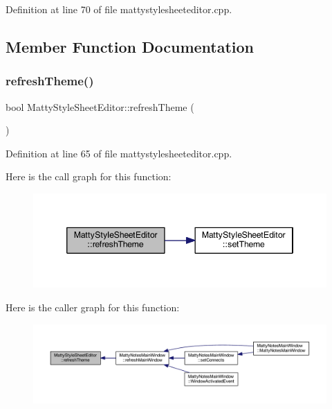 Definition at line 70 of file mattystylesheeteditor.\+cpp.



\subsection{Member Function Documentation}
\hypertarget{classMattyStyleSheetEditor_a203c6d82e1fa8bbbf61d30de4191fc01}{}\label{classMattyStyleSheetEditor_a203c6d82e1fa8bbbf61d30de4191fc01} 
\subsubsection{\texorpdfstring{refresh\+Theme()}{refreshTheme()}}
{\footnotesize\ttfamily bool Matty\+Style\+Sheet\+Editor\+::refresh\+Theme (\begin{DoxyParamCaption}{ }\end{DoxyParamCaption})\hspace{0.3cm}{\ttfamily [static]}}



Definition at line 65 of file mattystylesheeteditor.\+cpp.

Here is the call graph for this function\+:
\nopagebreak
\begin{figure}[H]
\begin{center}
\leavevmode
\includegraphics[width=346pt]{classMattyStyleSheetEditor_a203c6d82e1fa8bbbf61d30de4191fc01_cgraph}
\end{center}
\end{figure}
Here is the caller graph for this function\+:
\nopagebreak
\begin{figure}[H]
\begin{center}
\leavevmode
\includegraphics[width=350pt]{classMattyStyleSheetEditor_a203c6d82e1fa8bbbf61d30de4191fc01_icgraph}
\end{center}
\end{figure}
\hypertarget{classMattyStyleSheetEditor_aec3ccdf356aab4c3156562465e779498}{}\label{classMattyStyleSheetEditor_aec3ccdf356aab4c3156562465e779498} 
